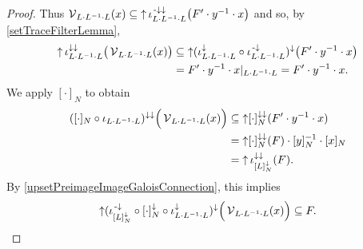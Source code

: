 \begin{proof}
Thus $\operatorname{\mathcal{V}}_{L\cdot L^{-1}\cdot L}(x) \subseteq \operatorname{\uparrow}\iota_{L\cdot L^{-1}\cdot L}^{{\text{\hspace{0.15em}-}\downarrow}\downarrow}\big(F'\cdot y^{-1}\cdot x\big)$ and so, by \ref{setTraceFilterLemma},
\begin{align*}
\operatorname{\uparrow} \iota_{L\cdot L^{-1}\cdot L}^{\downarrow\downarrow}\big(\operatorname{\mathcal{V}}_{L\cdot L^{-1}\cdot L}(x)\big) &\subseteq \operatorname{\uparrow}(\iota_{L\cdot L^{-1}\cdot L}^{\downarrow}\circ \iota_{L\cdot L^{-1}\cdot L}^{{\text{\hspace{0.15em}-}\downarrow}})^\downarrow\big(F'\cdot y^{-1}\cdot x\big) \\
&= F'\cdot y^{-1}\cdot x|_{L\cdot L^{-1}\cdot L} = F'\cdot y^{-1}\cdot x.
\end{align*}
We apply $[\cdot]_N$ to obtain
\begin{align*}
([\cdot]_N\circ \iota_{L\cdot L^{-1}\cdot L})^{\downarrow\downarrow}\Big(\operatorname{\mathcal{V}}_{L\cdot L^{-1}\cdot L}(x)\Big) &\subseteq \operatorname{\uparrow}[\cdot]_N^{\downarrow\downarrow}(F'\cdot y^{-1}\cdot x) \\
&= \operatorname{\uparrow}[\cdot]_N^{\downarrow\downarrow}(F)\cdot [y]_N^{-1} \cdot [x]_N \\
&= \operatorname{\uparrow}\iota^{\downarrow\downarrow}_{[L]_N^{\downarrow}}(F).
\end{align*}
By \ref{upsetPreimageImageGaloisConnection}, this implies
\[ \operatorname{\uparrow} (\iota^{{\text{\hspace{0.15em}-}\downarrow}}_{[L]_N^\downarrow} \circ [\cdot]_N^\downarrow\circ \iota_{L\cdot L^{-1}\cdot L}^\downarrow)^{\downarrow}\Big(\operatorname{\mathcal{V}}_{L\cdot L^{-1}\cdot L}(x)\Big) \subseteq F. \]
\end{proof}

